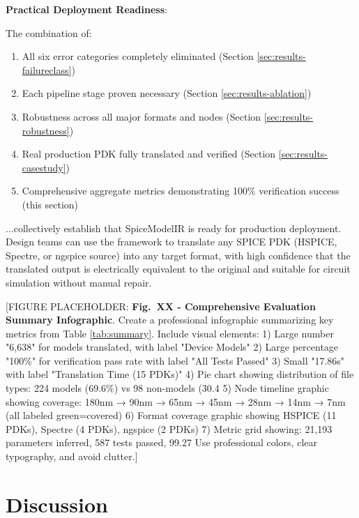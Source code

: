 \documentclass[conference]{IEEEtran}
\begin{document}
\textbf{Practical Deployment Readiness}:

The combination of:
\begin{enumerate}
\item All six error categories completely eliminated (Section \ref{sec:results-failureclass})
\item Each pipeline stage proven necessary (Section \ref{sec:results-ablation})
\item Robustness across all major formats and nodes (Section \ref{sec:results-robustness})
\item Real production PDK fully translated and verified (Section \ref{sec:results-casestudy})
\item Comprehensive aggregate metrics demonstrating 100\% verification success (this section)
\end{enumerate}

...collectively establish that SpiceModelIR is ready for production deployment. Design teams can use the framework to translate any SPICE PDK (HSPICE, Spectre, or ngspice source) into any target format, with high confidence that the translated output is electrically equivalent to the original and suitable for circuit simulation without manual repair.

[FIGURE PLACEHOLDER: \textbf{Fig.~XX - Comprehensive Evaluation Summary Infographic}. Create a professional infographic summarizing key metrics from Table \ref{tab:summary}. Include visual elements:
1) Large number "6,638" for models translated, with label "Device Models"
2) Large percentage "100\%" for verification pass rate with label "All Tests Passed"
3) Small "17.86s" with label "Translation Time (15 PDKs)"
4) Pie chart showing distribution of file types: 224 models (69.6\%) vs 98 non-models (30.4%
5) Node timeline graphic showing coverage: 180nm → 90nm → 65nm → 45nm → 28nm → 14nm → 7nm (all labeled green=covered)
6) Format coverage graphic showing HSPICE (11 PDKs), Spectre (4 PDKs), ngspice (2 PDKs)
7) Metric grid showing: 21,193 parameters inferred, 587 tests passed, 99.27%
Use professional colors, clear typography, and avoid clutter.]

\section{Discussion}
\label{sec:discussion}
\end{document}
